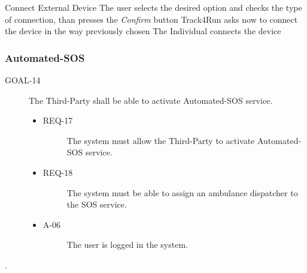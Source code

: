 \documentclass[a4paper]{article}
\newcommand{\requirement}{\ding{229}}%
\begin{document}
        
        \begin{usecase}{Connect External Device}
        {The user selects the desired option and checks the type of connection, than presses the \textit{Confirm} button}
        {Track4Run asks now to connect the device in the way previously chosen}
        {The Individual connects the device}
        \end{usecase}
        
        
        
        \subsubsection{Automated-SOS }
        
         \begin{description}
        	\item[GOAL-14] The Third-Party shall be able to activate Automated-SOS service.
            	\begin{itemize}
            	    \item[\requirement]
                	\begin{description}
                	\item[REQ-17] The system must allow the Third-Party to activate Automated-SOS service.
                	\end{description}
                	\item[\requirement]
                	\begin{description}
                	\item[REQ-18] The system must be able to assign an ambulance dispatcher to the SOS service.
                	\end{description}
                	\item
                	\begin{description}
                	\item[A-06] The user is logged in the system.
                	\end{description}
                	\end{itemize}
        \end{description}.
        
\end{document}
